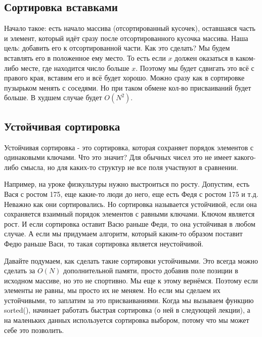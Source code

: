 \documentclass[12pt]{article}
\begin{document}
\subsection*{Сортировка вставками}
Начало такое: есть начало массива (отсортированный кусочек), оставшаяся часть и элемент, который идёт сразу после отсортированного кусочка массива. Наша цель: добавить его к отсортированной части. Как это сделать? Мы будем вставлять его в положенное ему место. То есть если $x$ должен оказаться в каком-либо месте, где находится число больше $x$. Поэтому мы будет сдвигать это всё с правого края, вставим его и всё будет хорошо. Можно сразу как в сортировке пузырьком менять с соседями. Но при таком обмене кол-во присваиваний будет больше. В худшем случае будет $O(N^2)$.

\subsection*{Устойчивая сортировка}
Устойчивая сортировка - это сортировка, которая сохраняет порядок элементов с одинаковыми ключами. Что это значит? Для обычных чисел это не имеет какого-либо смысла, но для каких-то структур не все поля участвуют в сравнении.

Например, на уроке физкультуры нужно выстроиться по росту. Допустим, есть Вася с ростом 175, еще какие-то люди до него, еще есть Федя с ростом 175 и т.д. Неважно как они сортировались. Но сортировка называется устойчивой, если она сохраняется взаимный порядок элементов с равными ключами. Ключом является рост. И если сортировка оставит Васю раньше Феди, то она устойчивая в любом случае. А если мы придумаем алгоритм, который каким-то образом поставит Федю раньше Васи, то такая сортировка является неустойчивой.

Давайте подумаем, как сделать такие сортировки устойчивыми. Это всегда можно сделать за $O(N)$ дополнительной памяти, просто добавив поле позиции в исходном массиве, но это не спортивно. Мы еще к этому вернёмся. Поэтому если элементы не равны, мы просто их не меняем. Но если мы сделаем их устойчивыми, то заплатим за это присваиваниями. Когда мы вызываем функцию sorted(), начинает работать быстрая сортировка (о ней в следующей лекции), а на маленьких данных используется сортировка выбором, потому что мы может себе это позволить.
\end{document}
